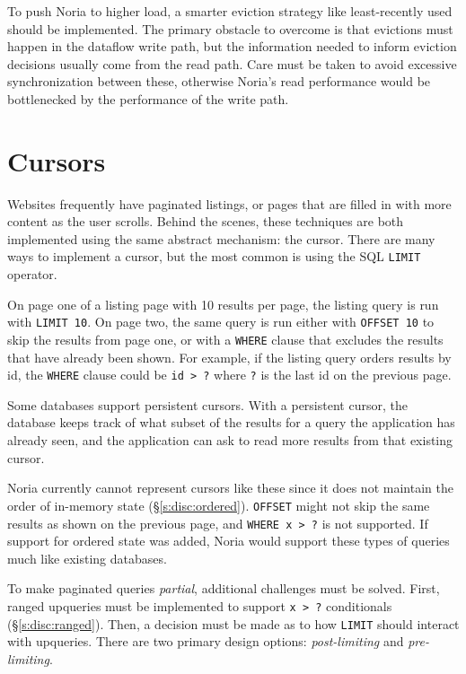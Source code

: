 To push Noria to higher load, a smarter eviction strategy like least-recently
used should be implemented. The primary obstacle to overcome is that evictions
must happen in the dataflow write path, but the information needed to inform
eviction decisions usually come from the read path. Care must be taken to avoid
excessive synchronization between these, otherwise Noria's read performance
would be bottlenecked by the performance of the write path.

\section{Cursors}

Websites frequently have paginated listings, or pages that are filled in with
more content as the user scrolls. Behind the scenes, these techniques are both
implemented using the same abstract mechanism: the cursor. There are many ways to
implement a cursor, but the most common is using the SQL \texttt{LIMIT}
operator.

On page one of a listing page with 10 results per page, the listing query is run
with \texttt{LIMIT 10}. On page two, the same query is run either with
\texttt{OFFSET 10} to skip the results from page one, or with a \texttt{WHERE}
clause that excludes the results that have already been shown. For example, if
the listing query orders results by id, the \texttt{WHERE} clause could be
\texttt{id > ?} where \texttt{?} is the last id on the previous page.

Some databases support persistent cursors. With a persistent cursor, the
database keeps track of what subset of the results for a query the application
has already seen, and the application can ask to read more results from that
existing cursor.

Noria currently cannot represent cursors like these since it does not maintain
the order of in-memory state (\S\ref{s:disc:ordered}). \texttt{OFFSET} might not
skip the same results as shown on the previous page, and \texttt{WHERE x > ?} is
not supported. If support for ordered state was added, Noria would support these
types of queries much like existing databases.

To make paginated queries \emph{partial}, additional challenges must be solved.
First, ranged upqueries must be implemented to support \texttt{x > ?}
conditionals (\S\ref{s:disc:ranged}). Then, a decision must be made as to how
\texttt{LIMIT} should interact with upqueries. There are two primary design
options: \emph{post-limiting} and \emph{pre-limiting}.


